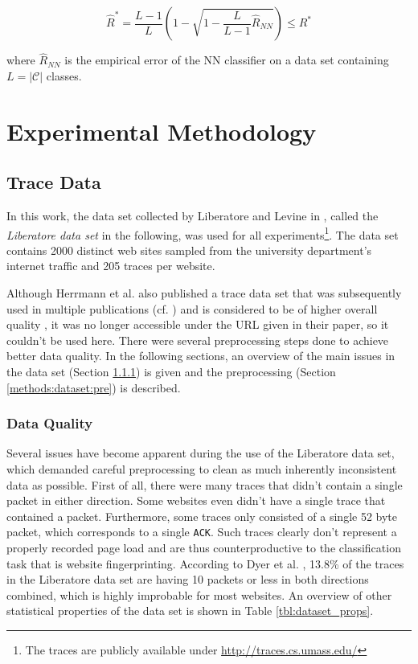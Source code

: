 \documentclass[
	ruledheaders=chapter,
	class=report,
	thesis={type=master, department=inf},
	accentcolor=1c,
	custommargins=true,
	marginpar=false,
	parskip=half-,
	fontsize=11pt,
]{tudapub}
\begin{document}
	\begin{equation}
		\widehat{R}^* = \frac{L - 1}{L} \left(1 - \sqrt{1 - \frac{L}{L-1}\widehat{R}_{NN}}\right) \leq R^*
		\label{eq:bayes_error_bound}
	\end{equation}
	
	where $\widehat{R}_{NN}$ is the empirical error of the NN classifier on a data set containing $L = |\mathcal{C}|$ classes.
	

	\chapter{Experimental Methodology}
	\label{methods}

	\section{Trace Data}
	\label{methods:dataset}

	In this work, the data set collected by Liberatore and Levine in \cite{Liberatore2006}, called the \textit{Liberatore data set} in the following, was used for all experiments\footnote{The traces are publicly available under \url{http://traces.cs.umass.edu/}}. The data set contains 2000 distinct web sites sampled from the university department's internet traffic and 205 traces per website. 
	
	Although Herrmann et al. \cite{Herrmann2009} also published a trace data set that was subsequently used in multiple publications (cf. \cite{Panchenko2011,Dyer2012}) and is considered to be of higher overall quality \cite{Dyer2012}, it was no longer accessible under the URL given in their paper, so it couldn't be used here. There were several preprocessing steps done to achieve better data quality. In the following sections, an overview of the main issues in the data set (Section \ref{methods:dataset:quality}) is given and the preprocessing (Section \ref{methods:dataset:pre}) is described.
	
	\subsection{Data Quality}
	\label{methods:dataset:quality}
	
	Several issues have become apparent during the use of the Liberatore data set, which demanded careful preprocessing to clean as much inherently inconsistent data as possible. First of all, there were many traces that didn't contain a single packet in either direction. Some websites even didn't have a single trace that contained a packet. Furthermore, some traces only consisted of a single 52 byte packet, which corresponds to a single \texttt{ACK}. Such traces clearly don't represent a properly recorded page load and are thus counterproductive to the classification task that is website fingerprinting. According to Dyer et al. \cite{Dyer2012}, 13.8\% of the traces in the Liberatore data set are having 10 packets or less in both directions combined, which is highly improbable for most websites. An overview of other statistical properties of the data set is shown in Table \ref{tbl:dataset_props}.
	
\end{document}
